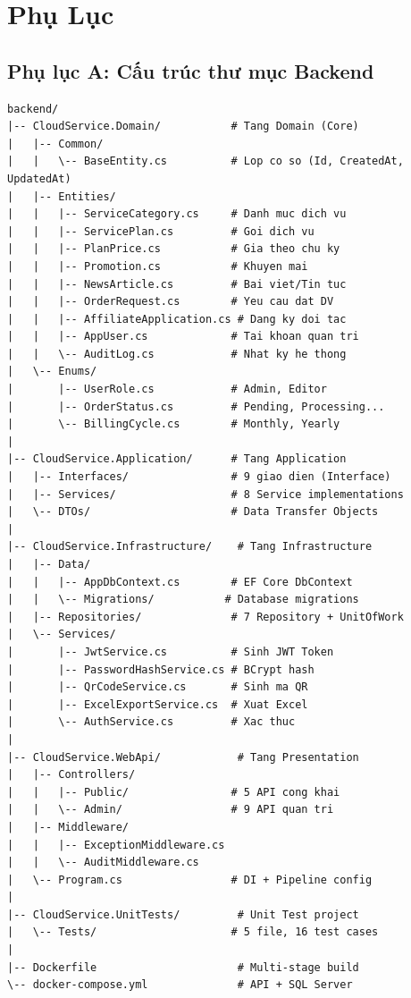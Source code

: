 \chapter*{Phụ Lục}

\section*{Phụ lục A: Cấu trúc thư mục Backend}
\begin{verbatim}
backend/
|-- CloudService.Domain/           # Tang Domain (Core)
|   |-- Common/
|   |   \-- BaseEntity.cs          # Lop co so (Id, CreatedAt, UpdatedAt)
|   |-- Entities/
|   |   |-- ServiceCategory.cs     # Danh muc dich vu
|   |   |-- ServicePlan.cs         # Goi dich vu
|   |   |-- PlanPrice.cs           # Gia theo chu ky
|   |   |-- Promotion.cs           # Khuyen mai
|   |   |-- NewsArticle.cs         # Bai viet/Tin tuc
|   |   |-- OrderRequest.cs        # Yeu cau dat DV
|   |   |-- AffiliateApplication.cs # Dang ky doi tac
|   |   |-- AppUser.cs             # Tai khoan quan tri
|   |   \-- AuditLog.cs            # Nhat ky he thong
|   \-- Enums/
|       |-- UserRole.cs            # Admin, Editor
|       |-- OrderStatus.cs         # Pending, Processing...
|       \-- BillingCycle.cs        # Monthly, Yearly
|
|-- CloudService.Application/      # Tang Application
|   |-- Interfaces/                # 9 giao dien (Interface)
|   |-- Services/                  # 8 Service implementations
|   \-- DTOs/                      # Data Transfer Objects
|
|-- CloudService.Infrastructure/    # Tang Infrastructure
|   |-- Data/
|   |   |-- AppDbContext.cs        # EF Core DbContext
|   |   \-- Migrations/           # Database migrations
|   |-- Repositories/              # 7 Repository + UnitOfWork
|   \-- Services/
|       |-- JwtService.cs          # Sinh JWT Token
|       |-- PasswordHashService.cs # BCrypt hash
|       |-- QrCodeService.cs       # Sinh ma QR
|       |-- ExcelExportService.cs  # Xuat Excel
|       \-- AuthService.cs         # Xac thuc
|
|-- CloudService.WebApi/            # Tang Presentation
|   |-- Controllers/
|   |   |-- Public/                # 5 API cong khai
|   |   \-- Admin/                 # 9 API quan tri
|   |-- Middleware/
|   |   |-- ExceptionMiddleware.cs
|   |   \-- AuditMiddleware.cs
|   \-- Program.cs                 # DI + Pipeline config
|
|-- CloudService.UnitTests/         # Unit Test project
|   \-- Tests/                     # 5 file, 16 test cases
|
|-- Dockerfile                      # Multi-stage build
\-- docker-compose.yml              # API + SQL Server
\end{verbatim}

